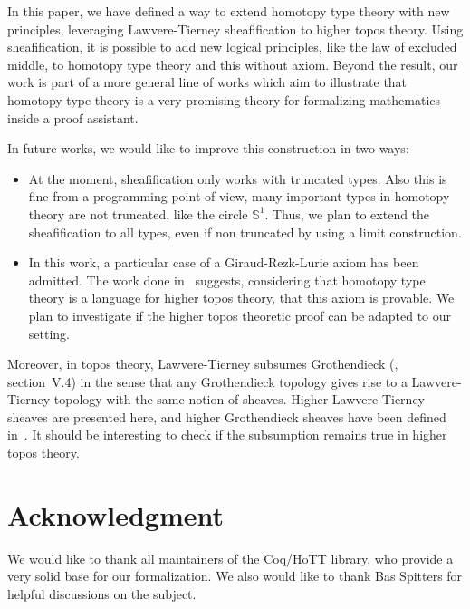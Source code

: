 \documentclass[conference]{IEEEtran}
\begin{document}
In this paper, we have defined a way to extend homotopy type theory
with new principles, leveraging Lawvere-Tierney sheafification to
higher topos theory. 
%
Using sheafification, it is possible to add new logical principles,
like the law of excluded middle, to homotopy type theory and this
without axiom.
%
Beyond the result, our work is part of a more general line of works
which aim to illustrate that homotopy type theory is a very promising
theory for formalizing mathematics inside a proof assistant.


In future works, we would like to improve this construction in two
ways:
\begin{itemize}
\item 
  At the moment, sheafification only works with truncated
  types. Also this is fine from a programming point of view, 
  many important types in homotopy theory are not
  truncated, like the circle $\mathbb S^1$.  Thus, we plan to extend
  the sheafification to all types, even if non truncated by using a
  limit construction.
\item 
  In this work, a particular case of a Giraud-Rezk-Lurie axiom has
  been admitted. The work done in~\cite[Chapter 6]{lurie} suggests,
  considering that homotopy type theory is a language for higher topos
  theory, that this axiom is provable. We plan to investigate if the
  higher topos theoretic proof can be adapted to our setting. 
\end{itemize}
Moreover, in topos theory, Lawvere-Tierney subsumes Grothendieck
(\cite{maclanemoerdijk}, section~V.4) in the sense that any
Grothendieck topology gives rise to a Lawvere-Tierney topology with
the same notion of sheaves. Higher Lawvere-Tierney sheaves are
presented here, and higher Grothendieck sheaves have been defined
in~\cite{lurie}. It should be interesting to check if the subsumption
remains true in higher topos theory.







\section*{Acknowledgment}

We would like to thank all maintainers of the Coq/HoTT library, who
provide a very solid base for our formalization. We also would like
to thank Bas Spitters for helpful discussions on the subject.
\end{document}

